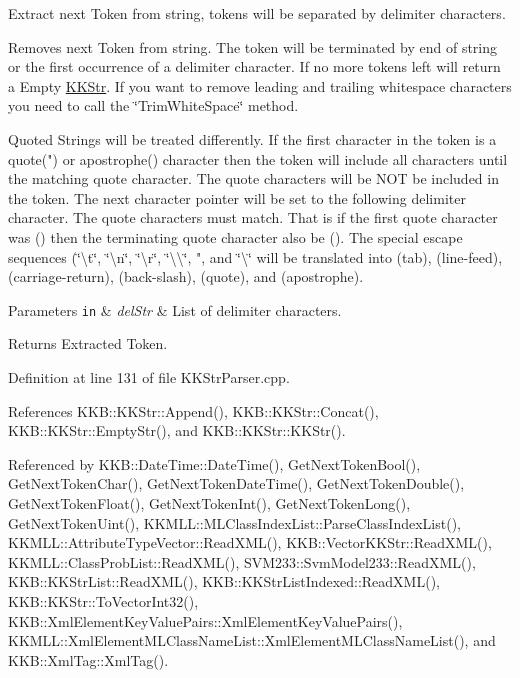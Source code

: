 Extract next Token from string, tokens will be separated by delimiter characters. 

Removes next Token from string. The token will be terminated by end of string or the first occurrence of a delimiter character. If no more tokens left will return a Empty \hyperlink{class_k_k_b_1_1_k_k_str}{K\+K\+Str}. If you want to remove leading and trailing whitespace characters you need to call the \char`\"{}\+Trim\+White\+Space\char`\"{} method.

Quoted Strings will be treated differently. If the first character in the token is a quote(") or apostrophe(\textquotesingle{}) character then the token will include all characters until the matching quote character. The quote characters will be N\+OT be included in the token. The next character pointer will be set to the following delimiter character. The quote characters must match. That is if the first quote character was (\textquotesingle{}) then the terminating quote character also be (\textquotesingle{}). The special escape sequences (\char`\"{}\textbackslash{}t\char`\"{}, \char`\"{}\textbackslash{}n\char`\"{}, \char`\"{}\textbackslash{}r\char`\"{}, \char`\"{}\textbackslash{}\textbackslash{}\char`\"{}, \textquotesingle{}"\textquotesingle{}, and \char`\"{}\textbackslash{}\textquotesingle{}\char`\"{} will be translated into (tab), (line-\/feed), (carriage-\/return), (back-\/slash), (quote), and (apostrophe).


\begin{DoxyParams}[1]{Parameters}
\mbox{\tt in}  & {\em del\+Str} & List of delimiter characters. \\
\hline
\end{DoxyParams}
\begin{DoxyReturn}{Returns}
Extracted Token. 
\end{DoxyReturn}


Definition at line 131 of file K\+K\+Str\+Parser.\+cpp.



References K\+K\+B\+::\+K\+K\+Str\+::\+Append(), K\+K\+B\+::\+K\+K\+Str\+::\+Concat(), K\+K\+B\+::\+K\+K\+Str\+::\+Empty\+Str(), and K\+K\+B\+::\+K\+K\+Str\+::\+K\+K\+Str().



Referenced by K\+K\+B\+::\+Date\+Time\+::\+Date\+Time(), Get\+Next\+Token\+Bool(), Get\+Next\+Token\+Char(), Get\+Next\+Token\+Date\+Time(), Get\+Next\+Token\+Double(), Get\+Next\+Token\+Float(), Get\+Next\+Token\+Int(), Get\+Next\+Token\+Long(), Get\+Next\+Token\+Uint(), K\+K\+M\+L\+L\+::\+M\+L\+Class\+Index\+List\+::\+Parse\+Class\+Index\+List(), K\+K\+M\+L\+L\+::\+Attribute\+Type\+Vector\+::\+Read\+X\+M\+L(), K\+K\+B\+::\+Vector\+K\+K\+Str\+::\+Read\+X\+M\+L(), K\+K\+M\+L\+L\+::\+Class\+Prob\+List\+::\+Read\+X\+M\+L(), S\+V\+M233\+::\+Svm\+Model233\+::\+Read\+X\+M\+L(), K\+K\+B\+::\+K\+K\+Str\+List\+::\+Read\+X\+M\+L(), K\+K\+B\+::\+K\+K\+Str\+List\+Indexed\+::\+Read\+X\+M\+L(), K\+K\+B\+::\+K\+K\+Str\+::\+To\+Vector\+Int32(), K\+K\+B\+::\+Xml\+Element\+Key\+Value\+Pairs\+::\+Xml\+Element\+Key\+Value\+Pairs(), K\+K\+M\+L\+L\+::\+Xml\+Element\+M\+L\+Class\+Name\+List\+::\+Xml\+Element\+M\+L\+Class\+Name\+List(), and K\+K\+B\+::\+Xml\+Tag\+::\+Xml\+Tag().


